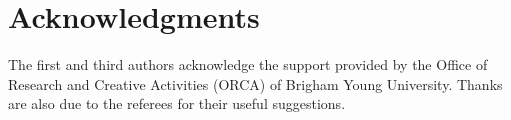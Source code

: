 \documentclass[final,3p,times,12pt]{elsarticle}
\begin{document}
%


\section*{Acknowledgments}
The first and third authors acknowledge the support provided by the Office of Research and Creative Activities (ORCA) of Brigham Young University.
Thanks are also due to the referees for their useful suggestions.





\end{document}
